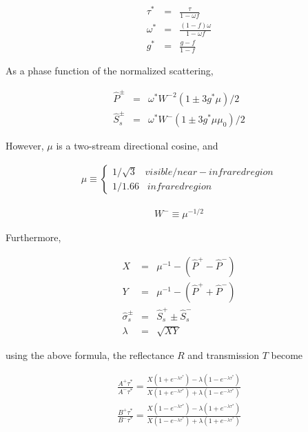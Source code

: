 \begin{eqnarray}
  \tau^* & = & \frac{\tau}{1-\omega f} \\
  \omega^* & = & \frac{(1-f)\omega}{1-\omega f}   \\
  g^* & = & \frac{g-f}{1-f}  
\end{eqnarray}

As a phase function of the normalized scattering,

\begin{eqnarray}
  \hat{P}^\pm   & = & \omega^* {W^-}^2 \left( 1 \pm 3g^* \mu \right)/2 \\
  \hat{S}_s^\pm & = & \omega^* W^-     \left( 1 \pm 3g^* \mu \mu_0 \right)/2
\end{eqnarray}

However, \(\mu\) is a two-stream directional cosine, and

\begin{eqnarray}
  \mu \equiv \left\{ \begin{array}{ll}
                   1/\sqrt{3} \; \; \;  visible/near-infrared region \\
                   1/1.66     \; \; \;  infrared region
                    \end{array}
             \right.
\end{eqnarray}

\begin{eqnarray}
  W^- \equiv \mu^{-1/2}
\end{eqnarray}

Furthermore,

\begin{eqnarray}
  X & = & \mu^{-1} - (\hat{P}^+ - \hat{P}^- ) \\
  Y & = & \mu^{-1} - (\hat{P}^+ + \hat{P}^- ) \\
  \hat{\sigma}_s^{\pm} & = & \hat{S}_s^+ \pm \hat{S}_s^- \\
  \lambda & = & \sqrt{XY}
\end{eqnarray}

using the above formula, the reflectance \(R\) and transmission \(T\) become

\begin{eqnarray}
 \frac{A^+{\tau^*}}{A^-{\tau^*}}
   =  \frac{X (1+e^{-\lambda\tau^*}) - \lambda (1-e^{-\lambda\tau^*})}
             {X (1+e^{-\lambda\tau^*}) + \lambda (1-e^{-\lambda\tau^*})} \\
 \frac{B^+{\tau^*}}{B^-{\tau^*}}
   =  \frac{X (1-e^{-\lambda\tau^*}) - \lambda (1+e^{-\lambda\tau^*})}
             {X (1-e^{-\lambda\tau^*}) + \lambda (1+e^{-\lambda\tau^*})}
\end{eqnarray}

